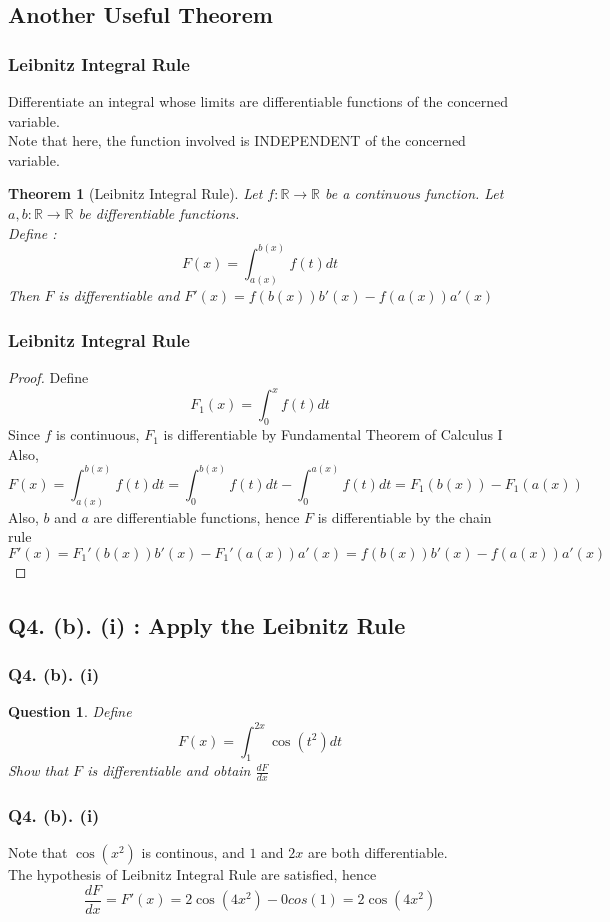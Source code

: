 \documentclass[handout,aspectratio=169]{beamer}
\newtheorem{thm}{Theorem}
\newtheorem{qsn}{Question}
\newcommand{\bR}{\mathbb{R}}
\begin{document}
\subsection{Another Useful Theorem}

\begin{frame}
\frametitle{Leibnitz Integral Rule}
\pause
Differentiate an integral whose limits are differentiable functions of the concerned variable.\\[1mm]\pause
Note that here, the function involved is INDEPENDENT of the concerned variable.\pause
\begin{thm}[Leibnitz Integral Rule]
Let $f:\bR\to\bR$ be a continuous function. Let $a,b : \bR\to\bR$ be differentiable functions.\\
Define :
$$F(x) = \int_{a(x)}^{b(x)} f(t)dt$$
Then $F$ is differentiable and $F'(x) = f(b(x))b'(x) - f(a(x))a'(x)$
\end{thm}
\end{frame}

\begin{frame}
\frametitle{Leibnitz Integral Rule}
\begin{proof}
\pause
Define $$F_1(x) = \int_0^x f(t)dt$$\pause
Since $f$ is continuous, $F_1$ is differentiable by Fundamental Theorem of Calculus I \\ \pause
Also, $$F(x) = \int_{a(x)}^{b(x)} f(t)dt = \int_0^{b(x)} f(t)dt - \int_0^{a(x)} f(t) dt = F_1(b(x)) - F_1(a(x))$$ \pause
Also, $b$ and $a$ are differentiable functions, hence $F$ is differentiable by the chain rule \pause
$$F'(x) = F_1'(b(x))b'(x) - F_1'(a(x))a'(x) = f(b(x))b'(x) - f(a(x))a'(x)$$
\end{proof}
\end{frame}

\subsection{Q4. (b). (i) : Apply the Leibnitz Rule}

\begin{frame}
\frametitle{Q4. (b). (i)}
\pause
\begin{qsn}
Define
$$F(x) = \int_{1}^{2x} \cos(t^2) dt$$
Show that $F$ is differentiable and obtain $\displaystyle{\frac{dF}{dx}}$
\end{qsn}
\end{frame}

\begin{frame}
\frametitle{Q4. (b). (i)}
\pause
Note that $\cos(x^2)$ is continous, and $1$ and $2x$ are both differentiable.\\[1mm]\pause
The hypothesis of Leibnitz Integral Rule are satisfied, hence 
$$\frac{dF}{dx} = F'(x) = 2\cos(4x^2) - 0cos(1) = 2\cos(4x^2)$$
\end{frame}
\end{document}
